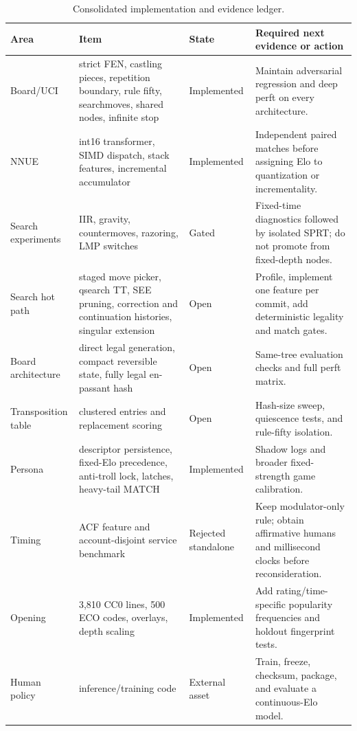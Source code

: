 \documentclass[conference]{IEEEtranSSP}
\begin{document}
\begin{table}[t]
\caption{Consolidated implementation and evidence ledger.}
\label{tab:status}
\centering
\scriptsize
\begin{tabular}{|p{}|p{}|p{}|p{}|}
\hline
Area & Item & State & Required next evidence or action \\
\hline
Board/UCI & strict FEN, castling pieces, repetition boundary, rule fifty, searchmoves, shared nodes, infinite stop & Implemented & Maintain adversarial regression and deep perft on every architecture. \\
\hline
NNUE & int16 transformer, SIMD dispatch, stack features, incremental accumulator & Implemented & Independent paired matches before assigning Elo to quantization or incrementality. \\
\hline
Search experiments & IIR, gravity, countermoves, razoring, LMP switches & Gated & Fixed-time diagnostics followed by isolated SPRT; do not promote from fixed-depth nodes. \\
\hline
Search hot path & staged move picker, qsearch TT, SEE pruning, correction and continuation histories, singular extension & Open & Profile, implement one feature per commit, add deterministic legality and match gates. \\
\hline
Board architecture & direct legal generation, compact reversible state, fully legal en-passant hash & Open & Same-tree evaluation checks and full perft matrix. \\
\hline
Transposition table & clustered entries and replacement scoring & Open & Hash-size sweep, quiescence tests, and rule-fifty isolation. \\
\hline
Persona & descriptor persistence, fixed-Elo precedence, anti-troll lock, latches, heavy-tail MATCH & Implemented & Shadow logs and broader fixed-strength game calibration. \\
\hline
Timing & ACF feature and account-disjoint service benchmark & Rejected standalone & Keep modulator-only rule; obtain affirmative humans and millisecond clocks before reconsideration. \\
\hline
Opening & 3,810 CC0 lines, 500 ECO codes, overlays, depth scaling & Implemented & Add rating/time-specific popularity frequencies and holdout fingerprint tests. \\
\hline
Human policy & inference/training code & External asset & Train, freeze, checksum, package, and evaluate a continuous-Elo model. \\

\end{tabular}
\end{table}
\end{document}
